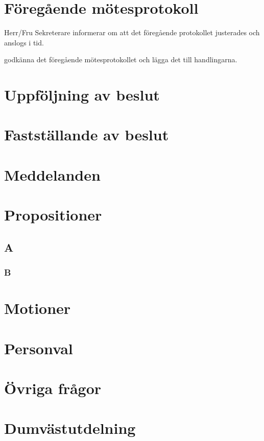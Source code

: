 \documentclass{sektionsmote}
\begin{document}
\section{Föregående mötesprotokoll}
Herr/Fru Sekreterare informerar om att det föregående protokollet justerades och anslogs i tid.
    \begin{beslut}
    \item godkänna det föregående mötesprotokollet och lägga det till handlingarna. 
    \end{beslut}


\section{Uppföljning av beslut}


\section{Fastställande av beslut}


\section{Meddelanden}


\section{Propositioner}
\subsection{A}
\subsubsection{B}


\section{Motioner}


\section{Personval}


\section{Övriga frågor}


\section{Dumvästutdelning}
\end{document}
